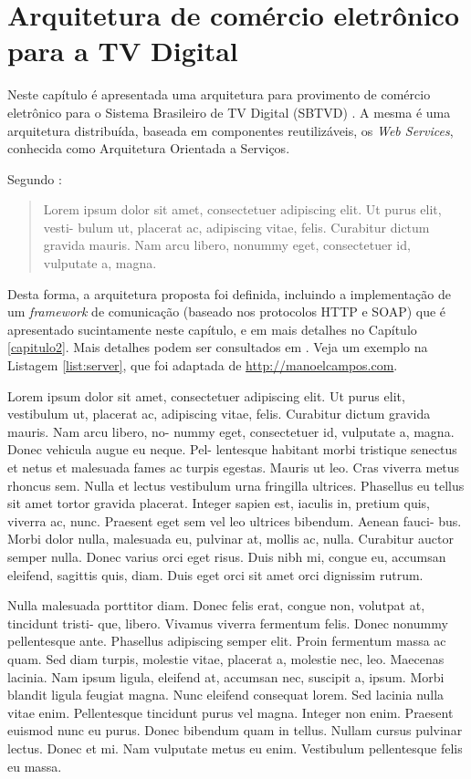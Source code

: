 \chapter{Arquitetura de comércio eletrônico para a TV Digital} \label{capitulo1}


Neste capítulo é apresentada uma arquitetura para provimento de comércio eletrônico
para o Sistema Brasileiro de TV Digital (SBTVD) . A mesma é uma arquitetura distribuída, baseada em componentes
reutilizáveis, os \textit{Web Services}, conhecida como Arquitetura Orientada a Serviços.

Segundo \cite{soares2007ginga}:

\begin{quote}
	Lorem ipsum dolor sit amet, consectetuer adipiscing elit. Ut purus elit, vesti- bulum ut, placerat ac, adipiscing vitae, felis. Curabitur dictum gravida mauris. Nam arcu libero, nonummy eget, consectetuer id, vulputate a, magna. 
\end{quote}

Desta forma, a arquitetura proposta foi definida, incluindo a implementação de um \textit{framework} de comunicação (baseado nos protocolos HTTP e SOAP) que é apresentado sucintamente neste capítulo, e em mais detalhes no Capítulo \ref{capitulo2}. Mais detalhes podem ser consultados em \cite{soares2007ginga}. Veja um exemplo na Listagem \ref{list:server}, que foi adaptada de \url{http://manoelcampos.com}.

Lorem ipsum dolor sit amet, consectetuer adipiscing elit. Ut purus elit, vestibulum ut, placerat ac, adipiscing vitae, felis. Curabitur dictum gravida mauris. Nam arcu libero, no- nummy eget, consectetuer id, vulputate a, magna. Donec vehicula augue eu neque. Pel- lentesque habitant morbi tristique senectus et netus et malesuada fames ac turpis egestas. Mauris ut leo. Cras viverra metus rhoncus sem. Nulla et lectus vestibulum urna fringilla ultrices. Phasellus eu tellus sit amet tortor gravida placerat. Integer sapien est, iaculis in, pretium quis, viverra ac, nunc. Praesent eget sem vel leo ultrices bibendum. Aenean fauci- bus. Morbi dolor nulla, malesuada eu, pulvinar at, mollis ac, nulla. Curabitur auctor semper nulla. Donec varius orci eget risus. Duis nibh mi, congue eu, accumsan eleifend, sagittis quis, diam. Duis eget orci sit amet orci dignissim rutrum.

Nulla malesuada porttitor diam. Donec felis erat, congue non, volutpat at, tincidunt tristi- que, libero. Vivamus viverra fermentum felis. Donec nonummy pellentesque ante. Phasellus adipiscing semper elit. Proin fermentum massa ac quam. Sed diam turpis, molestie vitae, placerat a, molestie nec, leo. Maecenas lacinia. Nam ipsum ligula, eleifend at, accumsan nec, suscipit a, ipsum. Morbi blandit ligula feugiat magna. Nunc eleifend consequat lorem. Sed lacinia nulla vitae enim. Pellentesque tincidunt purus vel magna. Integer non enim. Praesent euismod nunc eu purus. Donec bibendum quam in tellus. Nullam cursus pulvinar lectus. Donec et mi. Nam vulputate metus eu enim. Vestibulum pellentesque felis eu massa. 

